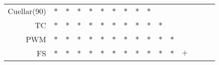 \documentclass[landscape, 6pt]{report}
\begin{document}
\begin{table}[h!]
\begin{center}
\begin{tabular}{ rccccccccccccccc }
    Cuellar(90) & $*$ & $*$ & $*$ & $*$ & $*$ & $*$ & $*$ & $*$ & $*$ &     &     &     &     &     &     \\
    TC & $*$ & $*$ & $*$ & $*$ & $*$ & $*$ & $*$ & $*$ & $*$ & $*$ &     &     &     &     &     \\
    PWM & $*$ & $*$ & $*$ & $*$ & $*$ & $*$ & $*$ & $*$ & $*$ & $*$ & $*$ &     &     &     &     \\
    FS & $*$ & $*$ & $*$ & $*$ & $*$ & $*$ & $*$ & $*$ & $*$ & $*$ & $*$ & $+$ &     &     &     \\
    \hline
  \end{tabular}
\end{center}
\vspace{0.0cm}
\end{table}
\end{document}
